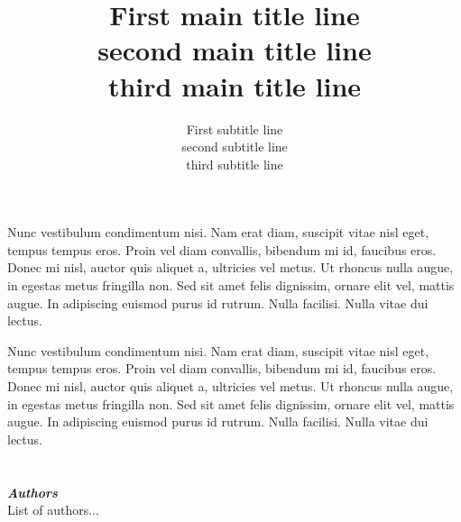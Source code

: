 \documentclass[10pt,a4paper]{article}
\title{First main title line\\
			 second main title line\\
			 third main title line
}
\subtitle{First subtitle line\\ 
					second subtitle line\\ 
					third subtitle line\\
}
\begin{document}
\frontpage
\noticePage




\setcounter{page}{1}
\tableofcontents
\cleardoublepage %
\setcounter{page}{1} %


\label{sec.foreword}

\noindent Nunc vestibulum condimentum nisi. Nam erat diam, suscipit vitae nisl eget, tempus tempus eros. Proin vel diam convallis, bibendum mi id, faucibus eros. Donec mi nisl, auctor quis aliquet a, ultricies vel metus. Ut rhoncus nulla augue, in egestas metus fringilla non. Sed sit amet felis dignissim, ornare elit vel, mattis augue. In adipiscing euismod purus id rutrum. Nulla facilisi. Nulla vitae dui lectus.

\newpage


\label{sec.ackno}

Nunc vestibulum condimentum nisi. Nam erat diam, suscipit vitae nisl eget, tempus tempus eros. Proin vel diam convallis, bibendum mi id, faucibus eros. Donec mi nisl, auctor quis aliquet a, ultricies vel metus. Ut rhoncus nulla augue, in egestas metus fringilla non. Sed sit amet felis dignissim, ornare elit vel, mattis augue. In adipiscing euismod purus id rutrum. Nulla facilisi. Nulla vitae dui lectus.\\
~\\
~\\
\noindent \textit{\textbf{Authors}}\\
\noindent List of authors...

\newpage

\end{document}
